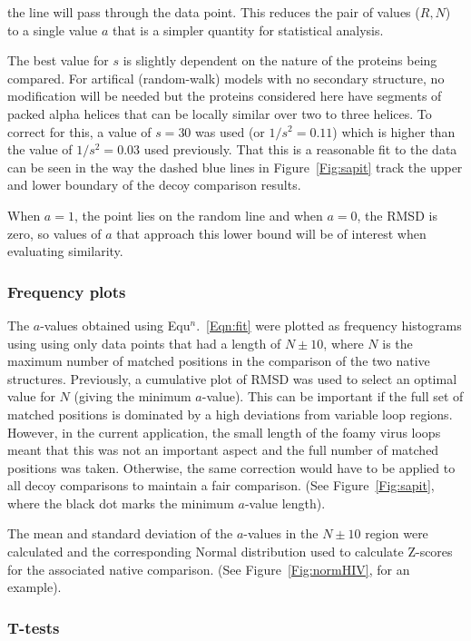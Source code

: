 \documentclass[preprint,12pt]{elsarticle}
\newcommand{\Fig}[1]{Figure~\ref{Fig:#1}}
\newcommand{\Eqn}[1]{Equ$^n$.~\ref{Eqn:#1}}
\begin{document}
the line will pass through the data point.  This reduces the pair of values ($R,N$) to a
single value $a$ that is a simpler quantity for statistical analysis.

The best value for $s$ is slightly dependent on the nature of the proteins being compared.
For artifical (random-walk)  models with no secondary structure, no modification will be needed but the
proteins considered here have segments of packed alpha helices that can be locally similar
over two to three helices.   To correct for this, a value of $s=30$ was used (or $1/s^2 = 0.11$)
which is higher than the value of $1/s^2 = 0.03$ used previously.
That this is a reasonable fit to the data can be seen in the way the dashed blue lines
in \Fig{sapit} track the upper and lower boundary of the decoy comparison results.

When $a=1$, the point lies on the random line and when $a=0$, the RMSD is zero, so values of
$a$ that approach this lower bound will be of interest when evaluating similarity.

\subsubsection{Frequency plots}

The $a$-values obtained using \Eqn{fit} were plotted as frequency histograms using using
only data points that had a length of $N\pm 10$, where $N$ is the maximum number of matched
positions in the comparison of the two native structures.   
Previously, a cumulative plot of RMSD was used to select an optimal value for
$N$ (giving the minimum $a$-value).   This can be important if the full set of matched
positions is dominated by a high deviations from variable loop regions.   However, in the
current application, the small length of the foamy virus loops meant that this was not
an important aspect and the full number of matched positions was taken.   Otherwise, the
same correction would have to be applied to all decoy comparisons to maintain a fair
comparison.  (See \Fig{sapit}, where the black dot marks the minimum $a$-value length).

The mean and standard deviation of the $a$-values in the $N\pm10$ region were calculated
and the corresponding Normal distribution used to calculate Z-scores for the associated
native comparison. (See \Fig{normHIV}, for an example).

\subsubsection{T-tests}
\end{document}
